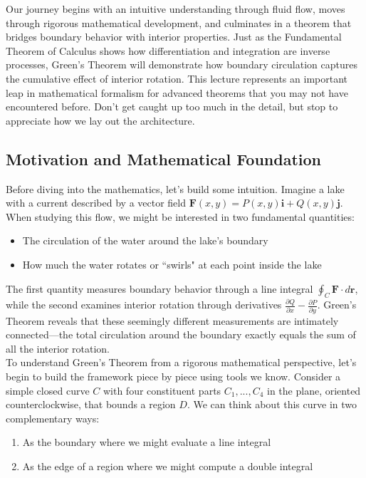 \noindent Our journey begins with an intuitive understanding through fluid flow, moves through rigorous mathematical development, and culminates in a theorem that bridges boundary behavior with interior properties. Just as the Fundamental Theorem of Calculus shows how differentiation and integration are inverse processes, Green's Theorem will demonstrate how boundary circulation captures the cumulative effect of interior rotation. This lecture represents an important leap in mathematical formalism for advanced theorems that you may not have encountered before. Don't get caught up too much in the detail, but stop to appreciate how we lay out the architecture. 


\subsection*{Motivation and Mathematical Foundation}

\noindent Before diving into the mathematics, let's build some intuition. Imagine a lake with a current described by a vector field $\mathbf{F}(x,y) = P(x,y)\mathbf{i} + Q(x,y)\mathbf{j}$. When studying this flow, we might be interested in two fundamental quantities:

\begin{itemize}
    \item The circulation of the water around the lake's boundary
    \item How much the water rotates or ``swirls" at each point inside the lake
\end{itemize}

\noindent The first quantity measures boundary behavior through a line integral $\oint_C \mathbf{F}\cdot d\mathbf{r}$, while the second examines interior rotation through derivatives $\frac{\partial Q}{\partial x} - \frac{\partial P}{\partial y}$. Green's Theorem reveals that these seemingly different measurements are intimately connected—the total circulation around the boundary exactly equals the sum of all the interior rotation. \\

\noindent To understand Green's Theorem from a rigorous mathematical perspective, let's begin to build the framework piece by piece using tools we know. Consider a simple closed curve $C$ with four constituent parts $C_1,...,C_4$ in the plane, oriented counterclockwise, that bounds a region $D$. We can think about this curve in two complementary ways:

\begin{enumerate}
    \item As the boundary where we might evaluate a line integral
    \item As the edge of a region where we might compute a double integral
\end{enumerate}

